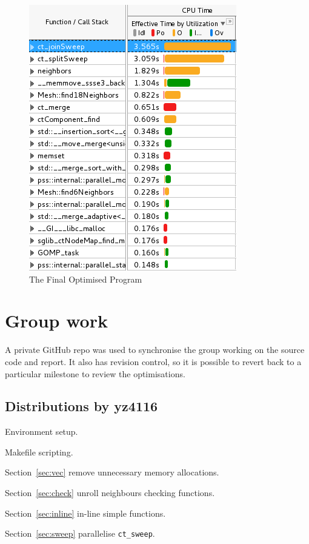 \documentclass[conference]{IEEEtran}
\newcommand{\sref}[1]{Section~\ref{#1}}
\begin{document}
\begin{figure}[!h]
    \centering
    \includegraphics[width=0.75\columnwidth]{opt_vtune}
    \caption{The Final Optimised Program}
    \label{fig:opt}
\end{figure}


\section{Group work}

A private GitHub repo was used to synchronise the group working on the source code and report. It also has revision control, so it is possible to revert back to a particular milestone to review the optimisations.

\subsection{Distributions by yz4116}

Environment setup.

Makefile scripting.

\sref{sec:vec} remove unnecessary memory allocations.

\sref{sec:check} unroll neighbours checking functions.

\sref{sec:inline} in-line simple functions.

\sref{sec:sweep} parallelise \texttt{ct\_sweep}.
\end{document}
